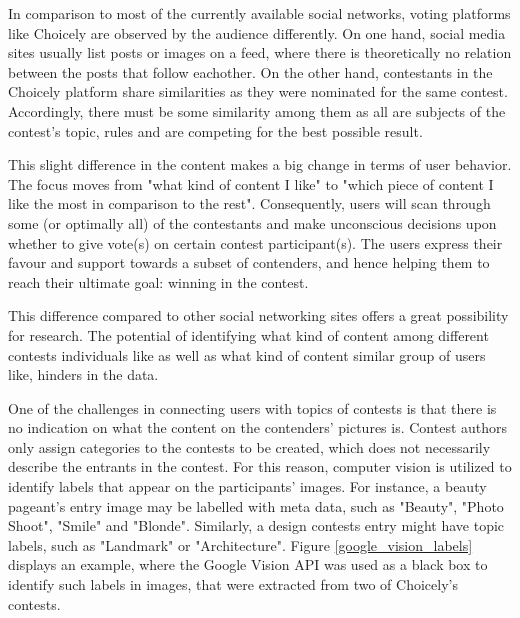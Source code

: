     In comparison to most of the currently available social networks, voting platforms like Choicely are observed by the audience differently. On one hand, social media sites usually list posts or images on a feed, where there is theoretically no relation between the posts that follow eachother. On the other hand, contestants in the Choicely platform share similarities as they were nominated for the same contest. Accordingly, there must be some similarity among them as all are subjects of the contest's topic, rules and are competing for the best possible result. 
    
    This slight difference in the content makes a big change in terms of user behavior. The focus moves from "what kind of content I like" to "which piece of content I like the most in comparison to the rest". Consequently, users will scan through some (or optimally all) of the contestants and make unconscious decisions upon whether to give vote(s) on certain contest participant(s). The users express their favour and support towards a subset of contenders, and hence helping them to reach their ultimate goal: winning in the contest. 

    This difference compared to other social networking sites offers a great possibility for research. The potential of identifying what kind of content among different contests individuals like as well as what kind of content similar group of users like, hinders in the data.    

    One of the challenges in connecting users with topics of contests is that there is no indication on what the content on the contenders' pictures is. Contest authors only assign categories to the contests to be created, which does not necessarily describe the entrants in the contest. For this reason, computer vision is utilized to identify labels that appear on the participants' images. For instance, a beauty pageant's entry image may be labelled with meta data, such as "Beauty", "Photo Shoot", "Smile" and "Blonde". Similarly, a design contests entry might have topic labels, such as "Landmark" or "Architecture". Figure \ref{google_vision_labels} displays an example, where the Google Vision API was used as a black box to identify such labels in images, that were extracted from two of Choicely's contests.

